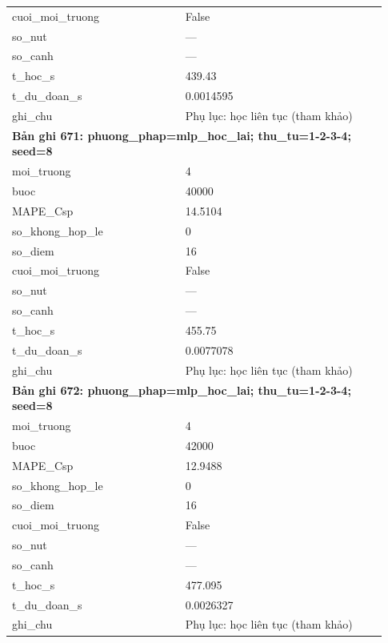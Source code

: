 \begin{longtable}{p{0.43\linewidth}p{0.50\linewidth}}
cuoi\_\allowbreak moi\_\allowbreak truong & False \\
so\_\allowbreak nut & — \\
so\_\allowbreak canh & — \\
t\_\allowbreak hoc\_\allowbreak s & 439.43 \\
t\_\allowbreak du\_\allowbreak doan\_\allowbreak s & 0.0014595 \\
ghi\_\allowbreak chu & Phụ lục: học liên tục (tham khảo) \\
\midrule
\multicolumn{2}{p{0.95\linewidth}}{\textbf{Bản ghi 671: phuong\_phap=mlp\_hoc\_lai; thu\_tu=1-2-3-4; seed=8}} \\
moi\_\allowbreak truong & 4 \\
buoc & 40000 \\
MAPE\_\allowbreak Csp & 14.5104 \\
so\_\allowbreak khong\_\allowbreak hop\_\allowbreak le & 0 \\
so\_\allowbreak diem & 16 \\
cuoi\_\allowbreak moi\_\allowbreak truong & False \\
so\_\allowbreak nut & — \\
so\_\allowbreak canh & — \\
t\_\allowbreak hoc\_\allowbreak s & 455.75 \\
t\_\allowbreak du\_\allowbreak doan\_\allowbreak s & 0.0077078 \\
ghi\_\allowbreak chu & Phụ lục: học liên tục (tham khảo) \\
\midrule
\multicolumn{2}{p{0.95\linewidth}}{\textbf{Bản ghi 672: phuong\_phap=mlp\_hoc\_lai; thu\_tu=1-2-3-4; seed=8}} \\
moi\_\allowbreak truong & 4 \\
buoc & 42000 \\
MAPE\_\allowbreak Csp & 12.9488 \\
so\_\allowbreak khong\_\allowbreak hop\_\allowbreak le & 0 \\
so\_\allowbreak diem & 16 \\
cuoi\_\allowbreak moi\_\allowbreak truong & False \\
so\_\allowbreak nut & — \\
so\_\allowbreak canh & — \\
t\_\allowbreak hoc\_\allowbreak s & 477.095 \\
t\_\allowbreak du\_\allowbreak doan\_\allowbreak s & 0.0026327 \\
ghi\_\allowbreak chu & Phụ lục: học liên tục (tham khảo) \\

\end{longtable}
